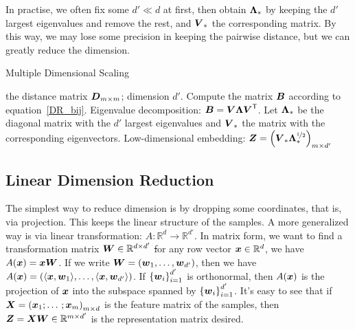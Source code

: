 In practise, we often fix some $d' \ll d$ at first, then obtain $\boldsymbol{\Lambda}_*$ by keeping the $d'$ largest 
eigenvalues and remove the rest, and $\boldsymbol{V}_*$ the corresponding matrix. By this way, we may lose some 
precision in keeping the pairwise distance, but we can greatly reduce the dimension.

\begin{algorithm}
    \caption{Multiple Dimensional Scaling}
    \begin{algorithmic}[1]
        \Require the distance matrix $\boldsymbol{D}_{m \times m}$; dimension $d'$.
        \State Compute the matrix $\boldsymbol{B}$ according to equation~\eqref{DR_bij}.
        \State Eigenvalue decomposition: $\boldsymbol{B} = \boldsymbol{V} \boldsymbol{\Lambda}{\boldsymbol{V}}^\mathsf{T}$.
        \State Let $\boldsymbol{\Lambda}_*$ be the diagonal matrix with the $d'$ largest eigenvalues and $\boldsymbol{V}_*$ the
        matrix with the corresponding eigenvectors.
        \Ensure Low-dimensional embedding: $\boldsymbol{Z} = {\left(\boldsymbol{V}_* \boldsymbol{\Lambda}_*^{\nicefrac{1}{2}}\right)}_{m 
        \times d'}$
    \end{algorithmic}
\end{algorithm}

\subsection{Linear Dimension Reduction}
The simplest way to reduce dimension is by dropping some coordinates, that is, via projection. This keeps the
linear structure of the samples. A more generalized way is via linear transformation: $A: \mathbb{R}^d 
\longrightarrow \mathbb{R}^{d'}$. In matrix form, we want to find a transformation matrix 
$\boldsymbol{W} \in \mathbb{R}^{d \times d'}$ \st for any row vector $\boldsymbol{x} \in \mathbb{R}^d$, we have
$A(\boldsymbol{x}) = \boldsymbol{x} \boldsymbol{W}$. If we write $\boldsymbol{W} = \left(\boldsymbol{w}_1, \dotsc, \boldsymbol{w}_{d'}\right)$, then we have
$A(\boldsymbol{x}) = \left(\langle \boldsymbol{x}, \boldsymbol{w}_1\rangle, \dotsc, \langle \boldsymbol{x}, \boldsymbol{w}_{d'}\rangle\right)$. If
${\left\{\boldsymbol{w}_i\right\}}_{i=1}^{d'}$ is orthonormal, then $A(\boldsymbol{x})$ is the projection of $\boldsymbol{x}$ into the
subspace spanned by ${\left\{\boldsymbol{w}_i\right\}}_{i=1}^{d'}$. It's easy to see that if 
$\boldsymbol{X} = {\left(\boldsymbol{x}_1; \dotsc; \boldsymbol{x}_m\right)}_{m \times d}$ is the feature matrix of the samples, then 
$\boldsymbol{Z} = \boldsymbol{X} \boldsymbol{W} \in \mathbb{R}^{m \times d'}$ is the representation matrix desired.

